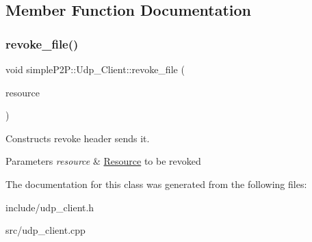 \subsection{Member Function Documentation}
\mbox{\label{classsimpleP2P_1_1Udp__Client_a459f622d0f3671d48d33bce035f5de90}} 
\subsubsection{\texorpdfstring{revoke\+\_\+file()}{revoke\_file()}}
{\footnotesize\ttfamily void simple\+P2\+P\+::\+Udp\+\_\+\+Client\+::revoke\+\_\+file (\begin{DoxyParamCaption}\item[{\hyperlink{classsimpleP2P_1_1Resource}{simple\+P2\+P\+::\+Resource}}]{resource }\end{DoxyParamCaption})}



Constructs revoke header sends it. 


\begin{DoxyParams}{Parameters}
{\em resource} & \hyperlink{classsimpleP2P_1_1Resource}{Resource} to be revoked \\
\hline
\end{DoxyParams}


The documentation for this class was generated from the following files\+:\begin{DoxyCompactItemize}
\item 
include/udp\+\_\+client.\+h\item 
src/udp\+\_\+client.\+cpp\end{DoxyCompactItemize}
